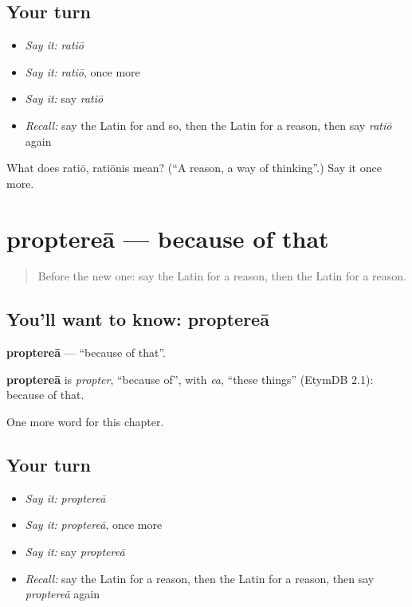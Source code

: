\subsection*{Your turn}
\begin{itemize}
\raggedright
  \item \emph{Say it:} \emph{ratiō}
  \item \emph{Say it:} \emph{ratiō}, once more
  \item \emph{Say it:} say \emph{ratiō}
  \item \emph{Recall:} say the Latin for and so, then the Latin for a reason, then say \emph{ratiō} again
\end{itemize}

\begin{tcolorbox}[breakable,colback=teal!4,colframe=teal!35!black,title={Before you move on}]
What does ratiō, ratiōnis mean? (\textquotedblleft{}A reason, a way of thinking\textquotedblright{}.) Say it once more.
\end{tcolorbox}
\section[proptereā]{proptereā — because of that}

\label{lesson:LA-C114-propterea}



\begin{quote}
Before the new one: say the Latin for a reason, then the Latin for a reason.
\end{quote}

\subsection*{You'll want to know: proptereā}
\textbf{proptereā} — \textquotedblleft{}because of that\textquotedblright{}.

\begin{cousinweb}
\textbf{proptereā} is \emph{propter}, \textquotedblleft{}because of\textquotedblright{}, with \emph{ea}, \textquotedblleft{}these things\textquotedblright{} (EtymDB 2.1): because of that.
\end{cousinweb}

\begin{grammarlens}[title={What you've built}]
One more word for this chapter.
\end{grammarlens}

\subsection*{Your turn}
\begin{itemize}
\raggedright
  \item \emph{Say it:} \emph{proptereā}
  \item \emph{Say it:} \emph{proptereā}, once more
  \item \emph{Say it:} say \emph{proptereā}
  \item \emph{Recall:} say the Latin for a reason, then the Latin for a reason, then say \emph{proptereā} again
\end{itemize}

